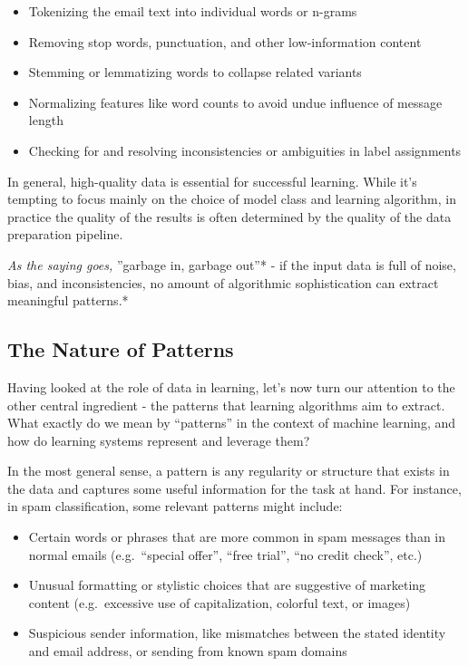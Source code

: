 \documentclass[
  9pt,
  letterpaper,
  abstract,
  titlepage]{scrbook}
\begin{document}
\begin{itemize}
\item
  Tokenizing the email text into individual words or n-grams
\item
  Removing stop words, punctuation, and other low-information content
\item
  Stemming or lemmatizing words to collapse related variants
\item
  Normalizing features like word counts to avoid undue influence of
  message length
\item
  Checking for and resolving inconsistencies or ambiguities in label
  assignments
\end{itemize}

In general, high-quality data is essential for successful learning.
While it's tempting to focus mainly on the choice of model class and
learning algorithm, in practice the quality of the results is often
determined by the quality of the data preparation pipeline.

\emph{As the saying goes, }''garbage in, garbage out''* - if the input
data is full of noise, bias, and inconsistencies, no amount of
algorithmic sophistication can extract meaningful patterns.*

\subsection{The Nature of Patterns}\label{the-nature-of-patterns}

Having looked at the role of data in learning, let's now turn our
attention to the other central ingredient - the patterns that learning
algorithms aim to extract. What exactly do we mean by ``patterns'' in
the context of machine learning, and how do learning systems represent
and leverage them?

In the most general sense, a pattern is any regularity or structure that
exists in the data and captures some useful information for the task at
hand. For instance, in spam classification, some relevant patterns might
include:

\begin{itemize}
\item
  Certain words or phrases that are more common in spam messages than in
  normal emails (e.g.~``special offer'', ``free trial'', ``no credit
  check'', etc.)
\item
  Unusual formatting or stylistic choices that are suggestive of
  marketing content (e.g.~excessive use of capitalization, colorful
  text, or images)
\item
  Suspicious sender information, like mismatches between the stated
  identity and email address, or sending from known spam domains
\end{itemize}
\end{document}
